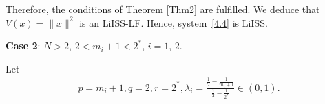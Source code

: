 \documentclass[onecolumn]{autart}
\newenvironment{proof of Prop.ODE}{{\it Proof of Proposition~\ref{Prop.ODE}:\enspace}}{\hfill $\blacksquare$\par}
\newenvironment{proof of PDE}{{\it Proof of Proposition \ref{Prop.8}:\enspace}}{\hfill $\blacksquare$\par}
\begin{document}
{\begin{proof of PDE}
	
	
	Therefore, the conditions of Theorem \ref{Thm2} are fulfilled. We deduce  that $V( {x})=\|x\|^{2}$ is {an LiISS-LF}. Hence, system~\eqref{4.4} is LiISS.
	
	
	
	
	\textbf{Case 2}:  $N > 2$,  $2 < m_{i} + 1 < 2^{*}$,  $i = 1$, $2$.
	
	Let
	\begin{align*}
		p=m_{i}+1, q=2, r=2^{*}, {\lambda_{i}}=\frac{\frac{1}{2}-\frac{1}{m_{i}+1}}{\frac{1}{2}-\frac{1}{2^{*}}}\in(0, 1).
	\end{align*}
	
	
	

\end{proof of PDE}}
\end{document}
